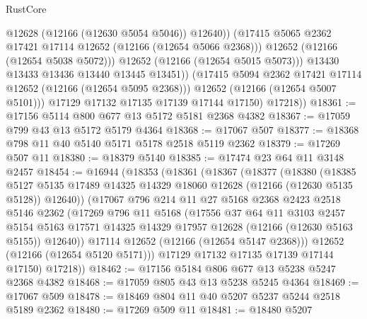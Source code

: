 \begin{lexlean}{RustCore}
\begin{coremodule}
                        @12628
                        (@12166 (@12630 @5054 @5046))
                        @12640))
                    (@17415 @5065 @2362 @17421 @17114 @12652 (@12166 (@12654 @5066 @2368)))
                    @12652
                    (@12166 (@12654 @5038 @5072)))
                  @12652
                  (@12166 (@12654 @5015 @5073)))
                @13430
                @13433
                @13436
                @13440
                @13445
                @13451))
            (@17415 @5094 @2362 @17421 @17114 @12652 (@12166 (@12654 @5095 @2368)))
            @12652
            (@12166 (@12654 @5007 @5101)))
          @17129
          @17132
          @17135
          @17139
          @17144
          @17150)
        @17218))
@18361 := @17156 @5114 @800 @677 @13 @5172 @5181 @2368 @4382
@18367 := @17059 @799 @43 @13 @5172 @5179 @4364
@18368 := @17067 @507
@18377 := @18368 @798 @11 @40 @5140 @5171 @5178 @2518 @5119 @2362
@18379 := @17269 @507 @11
@18380 := @18379 @5140
@18385 := @17474 @23 @64 @11 @3148 @2457
@18454 := @16944
    (@18353
      (@18361
        (@18367
          (@18377
            (@18380
              (@18385
                @5127
                @5135
                @17489
                @14325
                @14329
                @18060
                @12628
                (@12166 (@12630 @5135 @5128))
                @12640))
            (@17067
              @796
              @214
              @11
              @27
              @5168
              @2368
              @2423
              @2518
              @5146
              @2362
              (@17269
                @796
                @11
                @5168
                (@17556
                  @37
                  @64
                  @11
                  @3103
                  @2457
                  @5154
                  @5163
                  @17571
                  @14325
                  @14329
                  @17957
                  @12628
                  (@12166 (@12630 @5163 @5155))
                  @12640))
              @17114
              @12652
              (@12166 (@12654 @5147 @2368)))
            @12652
            (@12166 (@12654 @5120 @5171)))
          @17129
          @17132
          @17135
          @17139
          @17144
          @17150)
        @17218))
@18462 := @17156 @5184 @806 @677 @13 @5238 @5247 @2368 @4382
@18468 := @17059 @805 @43 @13 @5238 @5245 @4364
@18469 := @17067 @509
@18478 := @18469 @804 @11 @40 @5207 @5237 @5244 @2518 @5189 @2362
@18480 := @17269 @509 @11
@18481 := @18480 @5207

\end{coremodule}
\end{lexlean}
